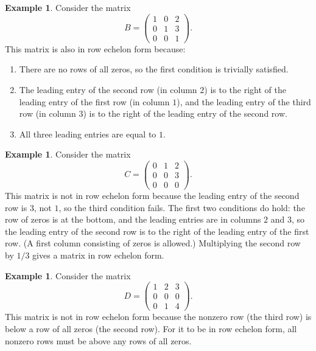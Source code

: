 \documentclass[11pt]{article}
\theoremstyle{definition}
\newtheorem{example}[definition]{Example}
\theoremstyle{plain}
\theoremstyle{remark}
\begin{document}
\begin{example}\label{ex:refB}
    Consider the matrix
    \[B = \begin{pmatrix}
        1 & 0 & 2 \\
        0 & 1 & 3 \\
        0 & 0 & 1
    \end{pmatrix}.\]
    This matrix is also in row echelon form because:
    \begin{enumerate}
        \item There are no rows of all zeros, so the first condition is trivially satisfied.
        \item The leading entry of the second row (in column $2$) is to the right of the leading entry of the first row (in column $1$), and the leading entry of the third row (in column $3$) is to the right of the leading entry of the second row.
        \item All three leading entries are equal to $1$.
    \end{enumerate}
\end{example}

\begin{example}
    Consider the matrix
    \[C = \begin{pmatrix}
        0 & 1 & 2 \\
        0 & 0 & 3 \\
        0 & 0 & 0
    \end{pmatrix}.\]
    This matrix is not in row echelon form because the leading entry of the second row is $3$, not $1$, so the third condition fails. The first two conditions do hold: the row of zeros is at the bottom, and the leading entries are in columns $2$ and $3$, so the leading entry of the second row is to the right of the leading entry of the first row. (A first column consisting of zeros is allowed.) Multiplying the second row by $1/3$ gives a matrix in row echelon form.
\end{example}

\begin{example}
    Consider the matrix
    \[D = \begin{pmatrix}
        1 & 2 & 3 \\
        0 & 0 & 0 \\
        0 & 1 & 4
    \end{pmatrix}.\]
    This matrix is not in row echelon form because the nonzero row (the third row) is below a row of all zeros (the second row). For it to be in row echelon form, all nonzero rows must be above any rows of all zeros.
\end{example}
\end{document}
